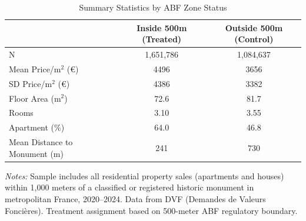 \begin{table}[t]
\centering
\caption{Summary Statistics by ABF Zone Status}
\label{tab:summary}
\begin{tabular}{lcc}
\toprule
 & Inside 500m (Treated) & Outside 500m (Control) \\
\midrule
N & 1,651,786 & 1,084,637 \\
Mean Price/m$^2$ (\euro) & 4496 & 3656 \\
SD Price/m$^2$ (\euro) & 4386 & 3382 \\
Floor Area (m$^2$) & 72.6 & 81.7 \\
Rooms & 3.10 & 3.55 \\
Apartment (\%) & 64.0 & 46.8 \\
Mean Distance to Monument (m) & 241 & 730 \\
\bottomrule
\end{tabular}
\begin{tablenotes}
\item \textit{Notes:} Sample includes all residential property sales (apartments and houses) within 1,000 meters of a classified or registered historic monument in metropolitan France, 2020--2024. Data from DVF (Demandes de Valeurs Fonci\`eres). Treatment assignment based on 500-meter ABF regulatory boundary.
\end{tablenotes}
\end{table}

